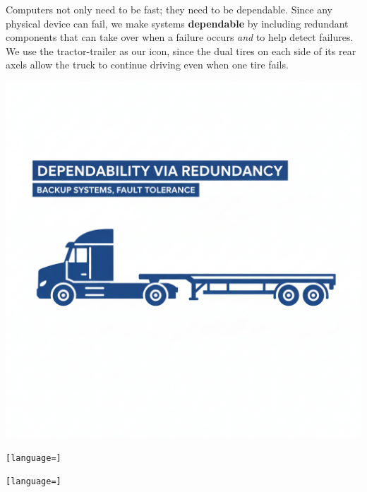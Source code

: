 \documentclass[a4paper,10pt]{article}
\begin{document}
\begin{minipage}[t]{0.7\linewidth}
Computers not only need to be fast; they need to be dependable. Since any physical device can fail, we make systems \textbf{dependable} by including redundant components that can take over when a failure occurs \textit{and} to help detect failures. We use the tractor-trailer as our icon, since the dual tires on each side of its rear axels allow the truck to continue driving even when one tire fails.
\end{minipage}
\hfill
\begin{minipage}[t]{0.28\linewidth}
    \centering
    \includegraphics[width=\linewidth]{resources/8_great_ideas_of_computer_architecture/depend_via_redundancy.png}
\end{minipage}


\begin{lstlisting}[language=]
\end{lstlisting}

\begin{lstlisting}[language=]
\end{lstlisting}
\end{document}
